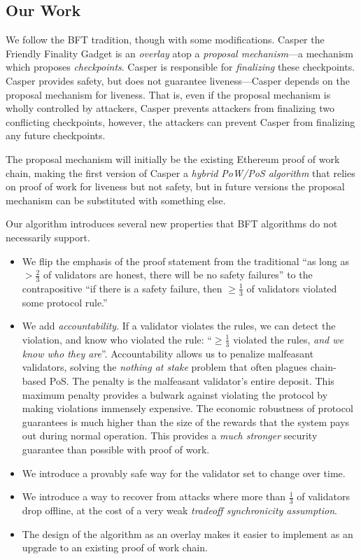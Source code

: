 \documentclass[12pt, final]{article}
\begin{document}
\subsection{Our Work}

We follow the BFT tradition, though with some modifications. Casper the Friendly Finality Gadget is an \textit{overlay} atop a \textit{proposal mechanism}---a mechanism which proposes \textit{checkpoints}.  Casper is responsible for \textit{finalizing} these checkpoints.  Casper provides safety, but does not guarantee liveness---Casper depends on the proposal mechanism for liveness.  That is, even if the proposal mechanism is wholly controlled by attackers, Casper prevents attackers from finalizing two conflicting checkpoints, however, the attackers can prevent Casper from finalizing any future checkpoints.

The proposal mechanism will initially be the existing Ethereum proof of work chain, making the first version of Casper a \textit{hybrid PoW/PoS algorithm} that relies on proof of work for liveness but not safety, but in future versions the proposal mechanism can be substituted with something else.

Our algorithm introduces several new properties that BFT algorithms do not necessarily support.
\begin{itemize}
\item We flip the emphasis of the proof statement from the traditional ``as long as $>\frac{2}{3}$ of validators are honest, there will be no safety failures'' to the contrapositive ``if there is a safety failure, then $\ge \frac{1}{3}$ of validators violated some protocol rule.''

\item We add \textit{accountability}.  If a validator violates the rules, we can detect the violation, and know who violated the rule: ``$\ge \frac{1}{3}$ violated the rules, \textit{and we know who they are}''.  Accountability allows us to penalize malfeasant validators, solving the \textit{nothing at stake} problem\cite{} that often plagues chain-based PoS. The penalty is the malfeasant validator's entire deposit.  This maximum penalty provides a bulwark against violating the protocol by making violations immensely expensive.  The economic robustness of protocol guarantees is much higher than the size of the rewards that the system pays out during normal operation.  This provides a \textit{much stronger} security guarantee than possible with proof of work.

\item We introduce a provably safe way for the validator set to change over time.
\item We introduce a way to recover from attacks where more than $\frac{1}{3}$ of validators drop offline, at the cost of a very weak \textit{tradeoff synchronicity assumption}.
\item The design of the algorithm as an overlay makes it easier to implement as an upgrade to an existing proof of work chain.
\end{itemize}
\end{document}
